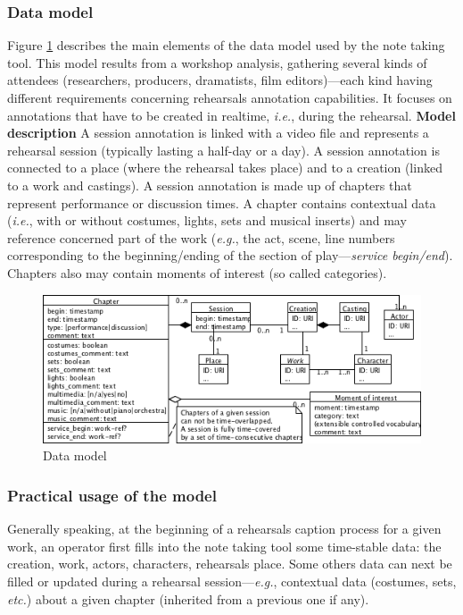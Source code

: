 \documentclass[conference]{IEEEtran}
\begin{document}
\subsubsection{Data model} Figure \ref{fig_data_model} describes the main elements of the data model used by the note taking tool. This model results from a workshop analysis, gathering several kinds of attendees (researchers, producers, dramatists, film editors)---each kind having different requirements concerning rehearsals annotation capabilities. It focuses on annotations that have to be created in realtime, \emph{i.e.}, during the rehearsal. \newline
\textbf{Model description} A session annotation is linked with a video file and represents a rehearsal session (typically lasting a half-day or a day). A session annotation is connected to a place (where the rehearsal takes place) and to a creation (linked to a work and castings). A session annotation is made up of chapters that represent performance or discussion times. A chapter contains contextual data (\emph{i.e.}, with or without costumes, lights, sets and musical inserts) and may reference concerned part of the work (\emph{e.g.}, the act, scene, line numbers corresponding to the beginning/ending of the section of play---\textit{service begin/end}). Chapters also may contain moments of interest (so called categories).
\begin{figure}[ht]
\centering
\includegraphics[width=\columnwidth]{UMLet_Data_model}
\caption{Data model}
\label{fig_data_model}
\end{figure}
\subsubsection{Practical usage of the model} Generally speaking, at the beginning of a rehearsals caption process for a given work, an operator first fills into the note taking tool some time-stable data: the creation, work, actors, characters, rehearsals place. Some others data can next be filled or updated during a rehearsal session---\emph{e.g.}, contextual data (costumes, sets, \emph{etc.}) about a given chapter (inherited from a previous one if any).
\end{document}
